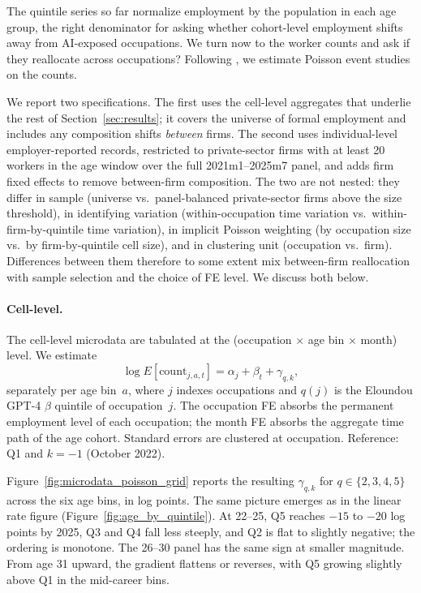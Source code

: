 The quintile series so far normalize employment by the population in each age group, the right denominator for asking whether cohort-level employment shifts away from AI-exposed occupations. We turn now to the worker counts and ask if they reallocate across occupations? Following \citet{brynjolfsson2025}, we estimate Poisson event studies on the counts.

We report two specifications. The first uses the cell-level aggregates that underlie the rest of Section~\ref{sec:results}; it covers the universe of formal employment and includes any composition shifts \emph{between} firms. The second uses individual-level employer-reported records, restricted to private-sector firms with at least 20 workers in the age window over the full 2021m1--2025m7 panel, and adds firm fixed effects to remove between-firm composition. The two are not nested: they differ in sample (universe vs.\ panel-balanced private-sector firms above the size threshold), in identifying variation (within-occupation time variation vs.\ within-firm-by-quintile time variation), in implicit Poisson weighting (by occupation size vs.\ by firm-by-quintile cell size), and in clustering unit (occupation vs.\ firm). Differences between them therefore to some extent mix between-firm reallocation with sample selection and the choice of FE level. We discuss both below.

\paragraph{Cell-level.}
The cell-level microdata are tabulated at the (occupation $\times$ age bin $\times$ month) level. We estimate
\[
\log E[\text{count}_{j,a,t}] = \alpha_{j} + \beta_{t} + \gamma_{q,k},
\]
separately per age bin~$a$, where $j$ indexes occupations and $q(j)$ is the Eloundou GPT-4 $\beta$ quintile of occupation~$j$. The occupation FE absorbs the permanent employment level of each occupation; the month FE absorbs the aggregate time path of the age cohort. Standard errors are clustered at occupation. Reference: Q1 and $k=-1$ (October 2022).

Figure~\ref{fig:microdata_poisson_grid} reports the resulting $\gamma_{q,k}$ for $q\in\{2,3,4,5\}$ across the six age bins, in log points. The same picture emerges as in the linear rate figure (Figure~\ref{fig:age_by_quintile}). At 22--25, Q5 reaches $-15$ to $-20$ log points by 2025, Q3 and Q4 fall less steeply, and Q2 is flat to slightly negative; the ordering is monotone. The 26--30 panel has the same sign at smaller magnitude. From age 31 upward, the gradient flattens or reverses, with Q5 growing slightly above Q1 in the mid-career bins.

